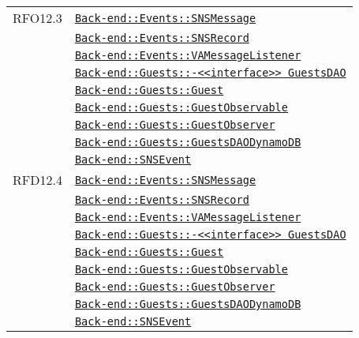 \begin{longtable}{|>{\centering}m{3cm}|m{10cm}<{\centering}|}
RFO12.3 & \hyperref[Back-end::Events::SNSMessage]{\texttt{Back-end::Events::SNSMessage}}\\
& \hyperref[Back-end::Events::SNSRecord]{\texttt{Back-end::Events::SNSRecord}}\\
& \hyperref[Back-end::Events::VAMessageListener]{\texttt{Back-end::Events::VAMessageListener}}\\
& \hyperref[Back-end::Guests::<<interface>> GuestsDAO]{\texttt{Back-end::Guests::-\linebreak <<interface>> GuestsDAO}}\\
& \hyperref[Back-end::Guests::Guest]{\texttt{Back-end::Guests::Guest}}\\
& \hyperref[Back-end::Guests::GuestObservable]{\texttt{Back-end::Guests::GuestObservable}}\\
& \hyperref[Back-end::Guests::GuestObserver]{\texttt{Back-end::Guests::GuestObserver}}\\
& \hyperref[Back-end::Guests::GuestsDAODynamoDB]{\texttt{Back-end::Guests::GuestsDAODynamoDB}}\\
& \hyperref[Back-end::SNSEvent]{\texttt{Back-end::SNSEvent}}\\ \hline

RFD12.4 & \hyperref[Back-end::Events::SNSMessage]{\texttt{Back-end::Events::SNSMessage}}\\
& \hyperref[Back-end::Events::SNSRecord]{\texttt{Back-end::Events::SNSRecord}}\\
& \hyperref[Back-end::Events::VAMessageListener]{\texttt{Back-end::Events::VAMessageListener}}\\
& \hyperref[Back-end::Guests::<<interface>> GuestsDAO]{\texttt{Back-end::Guests::-\linebreak <<interface>> GuestsDAO}}\\
& \hyperref[Back-end::Guests::Guest]{\texttt{Back-end::Guests::Guest}}\\
& \hyperref[Back-end::Guests::GuestObservable]{\texttt{Back-end::Guests::GuestObservable}}\\
& \hyperref[Back-end::Guests::GuestObserver]{\texttt{Back-end::Guests::GuestObserver}}\\
& \hyperref[Back-end::Guests::GuestsDAODynamoDB]{\texttt{Back-end::Guests::GuestsDAODynamoDB}}\\
& \hyperref[Back-end::SNSEvent]{\texttt{Back-end::SNSEvent}}\\ \hline


\end{longtable}
